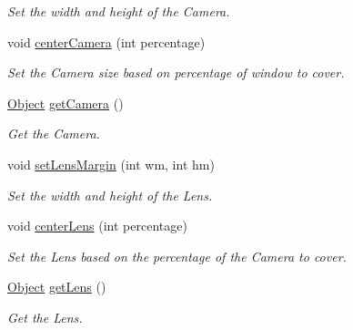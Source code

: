 \begin{DoxyCompactItemize}
\begin{DoxyCompactList}\small\item\em Set the width and height of the Camera. \end{DoxyCompactList}\item 
void \hyperlink{classTilesettmp_a1c215db0797e713c625076e6d228d337}{center\+Camera} (int percentage)\hypertarget{classTilesettmp_a1c215db0797e713c625076e6d228d337}{}\label{classTilesettmp_a1c215db0797e713c625076e6d228d337}

\begin{DoxyCompactList}\small\item\em Set the Camera size based on percentage of window to cover. \end{DoxyCompactList}\item 
\hyperlink{classObject}{Object} \hyperlink{classTilesettmp_a2a0bd1d3822573062c7e3f9cd1812c38}{get\+Camera} ()\hypertarget{classTilesettmp_a2a0bd1d3822573062c7e3f9cd1812c38}{}\label{classTilesettmp_a2a0bd1d3822573062c7e3f9cd1812c38}

\begin{DoxyCompactList}\small\item\em Get the Camera. \end{DoxyCompactList}\item 
void \hyperlink{classTilesettmp_a1bab5e74cf667af7c2e59b402099e92e}{set\+Lens\+Margin} (int wm, int hm)\hypertarget{classTilesettmp_a1bab5e74cf667af7c2e59b402099e92e}{}\label{classTilesettmp_a1bab5e74cf667af7c2e59b402099e92e}

\begin{DoxyCompactList}\small\item\em Set the width and height of the Lens. \end{DoxyCompactList}\item 
void \hyperlink{classTilesettmp_ac2ba66f9d1946f88a2aefd239e222bc0}{center\+Lens} (int percentage)\hypertarget{classTilesettmp_ac2ba66f9d1946f88a2aefd239e222bc0}{}\label{classTilesettmp_ac2ba66f9d1946f88a2aefd239e222bc0}

\begin{DoxyCompactList}\small\item\em Set the Lens based on the percentage of the Camera to cover. \end{DoxyCompactList}\item 
\hyperlink{classObject}{Object} \hyperlink{classTilesettmp_a8302da78056e328fb7c1b520c13f8dc6}{get\+Lens} ()\hypertarget{classTilesettmp_a8302da78056e328fb7c1b520c13f8dc6}{}\label{classTilesettmp_a8302da78056e328fb7c1b520c13f8dc6}

\begin{DoxyCompactList}\small\item\em Get the Lens. \end{DoxyCompactList}\end{DoxyCompactItemize}
